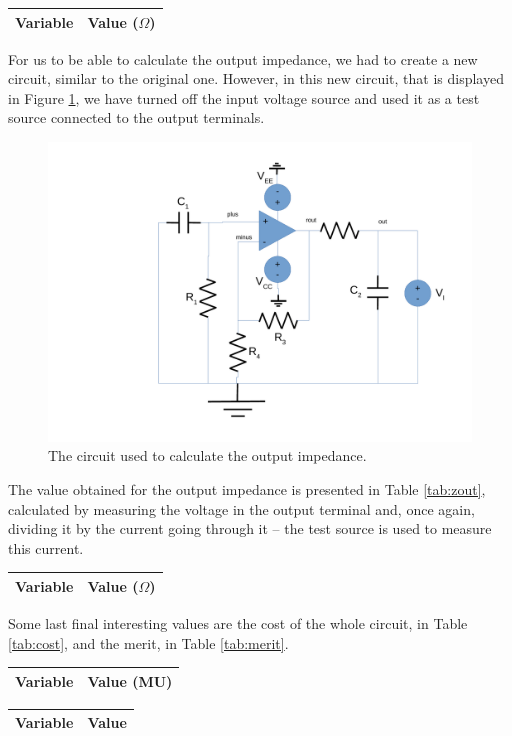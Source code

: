 \begin{center}
\begin{tabular}{|l|r|}
  \hline    
  {\bf Variable} & {\bf Value ($\Omega$)} \\ \hline
  
\end{tabular}
\end{center}

For us to be able to calculate the output impedance, we had to create a new circuit, similar to the original one. However, in this new circuit, that is displayed in Figure \ref{fig:circuit-out}, we have turned off the input voltage source and used it as a test source connected to the output terminals.

\begin{figure}[H] \centering
\includegraphics[width=0.7\linewidth]{circuit-out.pdf}
\caption{The circuit used to calculate the output impedance.}
\label{fig:circuit-out}
\end{figure}

The value obtained for the output impedance is presented in Table \ref{tab:zout}, calculated by measuring the voltage in the output terminal and, once again, dividing it by the current going through it -- the test source is used to measure this current.

\begin{center}
\begin{tabular}{|l|r|}
  \hline    
  {\bf Variable} & {\bf Value ($\Omega$)} \\ \hline
  
\end{tabular}
\end{center}

Some last final interesting values are the cost of the whole circuit, in Table \ref{tab:cost}, and the merit, in Table \ref{tab:merit}.

\begin{center}
\begin{tabular}{|l|r|}
  \hline    
  {\bf Variable} & {\bf Value (MU)} \\ \hline
  
\end{tabular}
\end{center}

\begin{center}
\begin{tabular}{|l|r|}
  \hline    
  {\bf Variable} & {\bf Value} \\ \hline
  
\end{tabular}
\end{center}